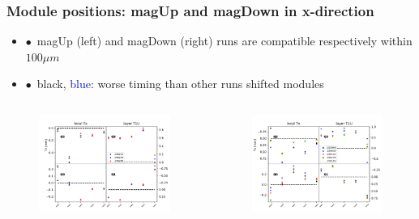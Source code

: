 \documentclass[aspectratio=1610, 12pt]{beamer}
\begin{document}
\begin{frame}\frametitle{Module positions: magUp and magDown in x-direction}
  \begin{itemize}
    \setlength\itemsep{0em}
    \item $\bullet$\, magUp (left) and magDown (right) runs are compatible respectively within $100 \mu m$
    \item $\bullet$\, black, \textcolor{blue}{blue}: worse timing than other runs \to shifted modules
  \end{itemize}
  \begin{columns}
    \begin{column}[c]{0.48\textwidth}
      \begin{figure}
        \includegraphics[width=\textwidth]{plots/plain_data/raw_MU_T1U_Tx.pdf}
      \end{figure}
    \end{column}
    \begin{column}[c]{0.48\textwidth}
      \begin{figure}
        \includegraphics[width=\textwidth]{plots/plain_data/raw_MD_T1U_Tx.pdf}

\end{figure}
\end{column}
\end{columns}
\end{frame}
\end{document}
